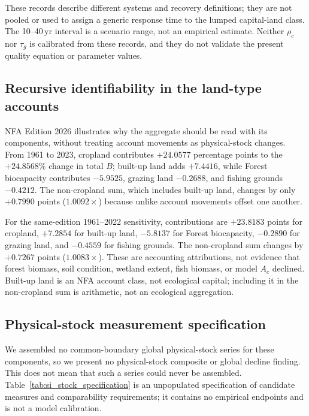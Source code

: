 \documentclass[11pt,a4paper]{article}
\begin{document}
These records describe different systems and recovery definitions; they are not pooled or used to assign a generic response time to the lumped capital-land class. The 10--40\,yr interval is a scenario range, not an empirical estimate. Neither $\rho_c$ nor $\tau_g$ is calibrated from these records, and they do not validate the present quality equation or parameter values.

\subsection{Recursive identifiability in the land-type accounts}\label{si:recursive}

NFA Edition 2026 illustrates why the aggregate should be read with its components, without treating account movements as physical-stock changes. From 1961 to 2023, cropland contributes $+24.0577$ percentage points to the $+24.8568\%$ change in total $B$; built-up land adds $+7.4416$, while Forest biocapacity contributes $-5.9525$, grazing land $-0.2688$, and fishing grounds $-0.4212$. The non-cropland sum, which includes built-up land, changes by only $+0.7990$ points ($1.0092\times$) because unlike account movements offset one another.

For the same-edition 1961--2022 sensitivity, contributions are $+23.8183$ points for cropland, $+7.2854$ for built-up land, $-5.8137$ for Forest biocapacity, $-0.2890$ for grazing land, and $-0.4559$ for fishing grounds. The non-cropland sum changes by $+0.7267$ points ($1.0083\times$). These are accounting attributions, not evidence that forest biomass, soil condition, wetland extent, fish biomass, or model $A_c$ declined. Built-up land is an NFA account class, not ecological capital; including it in the non-cropland sum is arithmetic, not an ecological aggregation.

\subsection{Physical-stock measurement specification}\label{si:stocks}

We assembled no common-boundary global physical-stock series for these components, so we present no physical-stock composite or global decline finding. This does not mean that such a series could never be assembled. Table~\ref{tab:si_stock_specification} is an unpopulated specification of candidate measures and comparability requirements; it contains no empirical endpoints and is not a model calibration.
\end{document}
